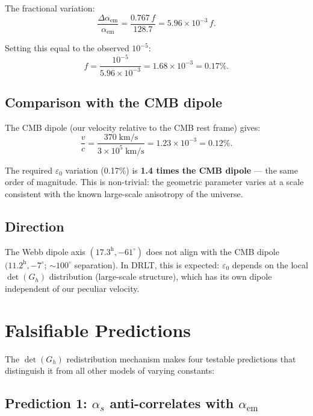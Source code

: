 \documentclass[12pt]{article}
\theoremstyle{remark}
\begin{document}
The fractional variation:
\begin{equation}
\frac{\Delta\alpha_\text{em}}{\alpha_\text{em}} = \frac{0.767\,f}{128.7} = 5.96 \times 10^{-3}\,f.
\end{equation}

Setting this equal to the observed $10^{-5}$:
\begin{equation}
\boxed{f = \frac{10^{-5}}{5.96 \times 10^{-3}} = 1.68 \times 10^{-3} = 0.17\%.}
\end{equation}

\subsection{Comparison with the CMB dipole}

The CMB dipole (our velocity relative to the CMB rest frame) gives:
\begin{equation}
\frac{v}{c} = \frac{370\;\text{km/s}}{3 \times 10^5\;\text{km/s}} = 1.23 \times 10^{-3} = 0.12\%.
\end{equation}

The required $\varepsilon_0$ variation (0.17\%) is \textbf{1.4 times the CMB dipole} --- the same order of magnitude. This is non-trivial: the geometric parameter varies at a scale consistent with the known large-scale anisotropy of the universe.

\subsection{Direction}

The Webb dipole axis $(17.3^\text{h}, -61^\circ)$ does not align with the CMB dipole $(11.2^\text{h}, -7^\circ$; $\sim 100^\circ$ separation). In DRLT, this is expected: $\varepsilon_0$ depends on the local $\det(G_h)$ distribution (large-scale structure), which has its own dipole independent of our peculiar velocity.

\section{Falsifiable Predictions}

The $\det(G_h)$ redistribution mechanism makes four testable predictions that distinguish it from all other models of varying constants:

\subsection{Prediction 1: $\alpha_s$ anti-correlates with $\alpha_\text{em}$}
\end{document}
